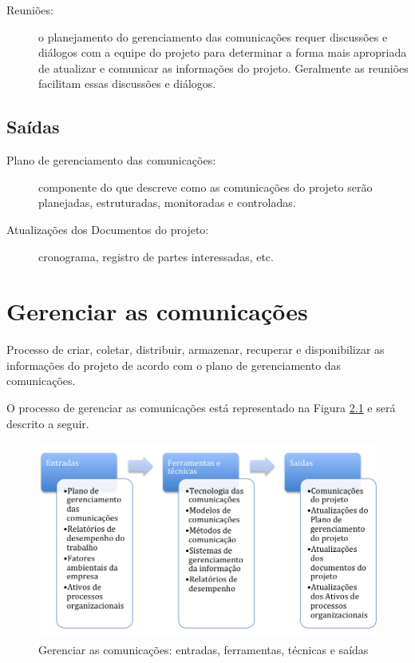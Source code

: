 \begin{description}
\begin{description}
		\end{description}	
		
	\item[Reuniões:] o planejamento do gerenciamento das comunicações requer discussões e diálogos com a equipe do projeto para determinar a forma mais apropriada de atualizar e comunicar as informações do projeto. Geralmente as reuniões facilitam essas discussões e diálogos.
	
\end{description}

\section{Saídas}

\begin{description}
	
	\item[Plano de gerenciamento das comunicações:] componente do \planproj que descreve como as comunicações do projeto serão planejadas, estruturadas, monitoradas e controladas.
	
	\item[Atualizações dos Documentos do projeto:] cronograma, registro de partes interessadas, etc.
	
\end{description}

\chapter{Gerenciar as comunicações}

Processo de criar, coletar, distribuir, armazenar, recuperar e disponibilizar as informações do projeto de acordo com o plano de gerenciamento das comunicações.

O processo de gerenciar as comunicações está representado na Figura \ref{fig:comunic:ger:efts} e será descrito a seguir.

\begin{figure}[!h]
	\centering
	\includegraphics[scale=0.5]{Figuras/comunicacoes_efts_gerenciar.png}
	\caption{Gerenciar as comunicações: entradas, ferramentas, técnicas e saídas}
	\label{fig:comunic:ger:efts}
\end{figure}


